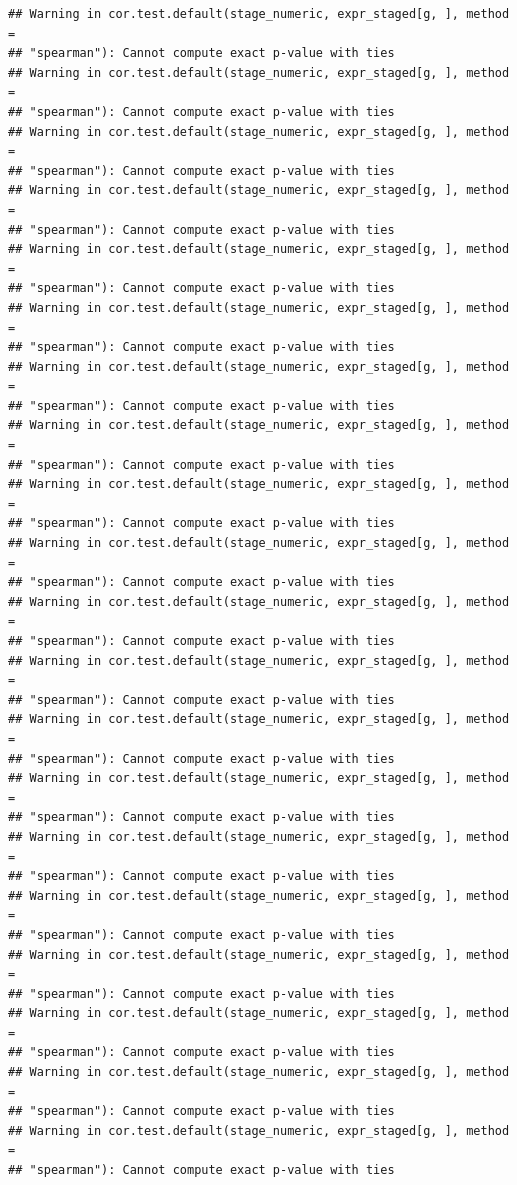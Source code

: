 \documentclass[
]{article}
\begin{document}
\begin{verbatim}
## Warning in cor.test.default(stage_numeric, expr_staged[g, ], method =
## "spearman"): Cannot compute exact p-value with ties
## Warning in cor.test.default(stage_numeric, expr_staged[g, ], method =
## "spearman"): Cannot compute exact p-value with ties
## Warning in cor.test.default(stage_numeric, expr_staged[g, ], method =
## "spearman"): Cannot compute exact p-value with ties
## Warning in cor.test.default(stage_numeric, expr_staged[g, ], method =
## "spearman"): Cannot compute exact p-value with ties
## Warning in cor.test.default(stage_numeric, expr_staged[g, ], method =
## "spearman"): Cannot compute exact p-value with ties
## Warning in cor.test.default(stage_numeric, expr_staged[g, ], method =
## "spearman"): Cannot compute exact p-value with ties
## Warning in cor.test.default(stage_numeric, expr_staged[g, ], method =
## "spearman"): Cannot compute exact p-value with ties
## Warning in cor.test.default(stage_numeric, expr_staged[g, ], method =
## "spearman"): Cannot compute exact p-value with ties
## Warning in cor.test.default(stage_numeric, expr_staged[g, ], method =
## "spearman"): Cannot compute exact p-value with ties
## Warning in cor.test.default(stage_numeric, expr_staged[g, ], method =
## "spearman"): Cannot compute exact p-value with ties
## Warning in cor.test.default(stage_numeric, expr_staged[g, ], method =
## "spearman"): Cannot compute exact p-value with ties
## Warning in cor.test.default(stage_numeric, expr_staged[g, ], method =
## "spearman"): Cannot compute exact p-value with ties
## Warning in cor.test.default(stage_numeric, expr_staged[g, ], method =
## "spearman"): Cannot compute exact p-value with ties
## Warning in cor.test.default(stage_numeric, expr_staged[g, ], method =
## "spearman"): Cannot compute exact p-value with ties
## Warning in cor.test.default(stage_numeric, expr_staged[g, ], method =
## "spearman"): Cannot compute exact p-value with ties
## Warning in cor.test.default(stage_numeric, expr_staged[g, ], method =
## "spearman"): Cannot compute exact p-value with ties
## Warning in cor.test.default(stage_numeric, expr_staged[g, ], method =
## "spearman"): Cannot compute exact p-value with ties
## Warning in cor.test.default(stage_numeric, expr_staged[g, ], method =
## "spearman"): Cannot compute exact p-value with ties
## Warning in cor.test.default(stage_numeric, expr_staged[g, ], method =
## "spearman"): Cannot compute exact p-value with ties
## Warning in cor.test.default(stage_numeric, expr_staged[g, ], method =
## "spearman"): Cannot compute exact p-value with ties

\end{verbatim}
\end{document}
